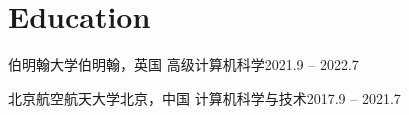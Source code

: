 \section{Education}


\begin{CVentries}
  \CVentry
    \CVhead
      {伯明翰大学}{伯明翰，英国}
      {高级计算机科学}{2021.9 -- 2022.7}

  \CVentry
    \CVhead
      {北京航空航天大学}{北京，中国}
      {计算机科学与技术}{2017.9 -- 2021.7}
\end{CVentries}
